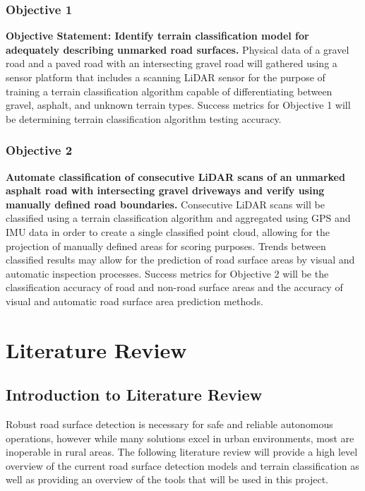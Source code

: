 \documentclass[numbered,pdftex]{ohio-etd}
\begin{document}
{	\subsection{Objective 1}
	
		{\textbf{Objective Statement: Identify terrain classification model for adequately describing unmarked road surfaces.} Physical data of a gravel road and a paved road with an intersecting gravel road will gathered using a sensor platform that includes a scanning LiDAR sensor for the purpose of training a terrain classification algorithm capable of differentiating between gravel, asphalt, and unknown terrain types. Success metrics for Objective 1 will be determining terrain classification algorithm testing accuracy.}

	\subsection{Objective 2}

		{\textbf{Automate classification of consecutive LiDAR scans of an unmarked asphalt road with intersecting gravel driveways and verify using manually defined road boundaries.} Consecutive LiDAR scans will be classified using a terrain classification algorithm and aggregated using GPS and IMU data in order to create a single classified point cloud, allowing for the projection of manually defined areas for scoring purposes. Trends between classified results may allow for the prediction of road surface areas by visual and automatic inspection processes. Success metrics for Objective 2 will be the classification accuracy of road and non-road surface areas and the accuracy of visual and automatic road surface area prediction methods.}


\chapter{Literature Review}

	\section{Introduction to Literature Review}
		
		{Robust road surface detection is necessary for safe and reliable autonomous operations, however while many solutions excel in urban environments, most are inoperable in rural areas. The following literature review will provide a high level overview of the current road surface detection models and terrain classification as well as providing an overview of the tools that will be used in this project.}
		
}
\end{document}
